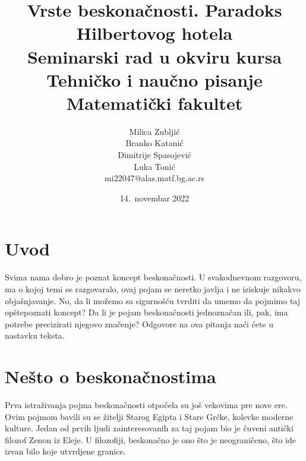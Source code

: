 \documentclass[a4paper]{article}
\begin{document}
\title{Vrste beskonačnosti. Paradoks Hilbertovog hotela\\ \small{Seminarski rad u okviru kursa\\Tehničko i naučno pisanje\\ Matematički fakultet}}

\author{Milica Zubljić\\ Branko Katanić\\ Dimitrije Spasojević\\ Luka Tonić\\ mi22047@alas.matf.bg.ac.rs}
\date{14.~novembar 2022}
\maketitle


\newpage

\tableofcontents %

\newpage

\section{Uvod}
\label{poglavlje:uvod}

Svima nama dobro je poznat koncept beskonačnosti. U svakodnevnom razgovoru, ma o kojoj temi se razgovaralo, ovaj pojam se neretko javlja i ne iziskuje nikakvo objašnjavanje. No, da li možemo sa sigurnošću tvrditi da umemo da pojmimo taj opštepoznati koncept? Da li je pojam beskonačnosti jednoznačan ili, pak, ima potrebe precizirati njegovo značenje? Odgovore na ova pitanja naći ćete u nastavku teksta.

\section{Nešto o beskonačnostima}
\label{poglavlje:Nešto o beskonačnostima}

Prva istraživanja pojma beskonačnosti otpočela su još vekovima pre nove ere. Ovim pojmom bavili su se žitelji Starog Egipta i Stare Grčke, kolevke moderne kulture. Jedan od prvih ljudi zainteresovanih za taj pojam bio je čuveni antički filozof Zenon iz Eleje. \cite{Zenon} U filozofiji, beskonačno je ono što je neograničeno, što ide izvan bilo koje utvrdjene granice.\\
\end{document}
